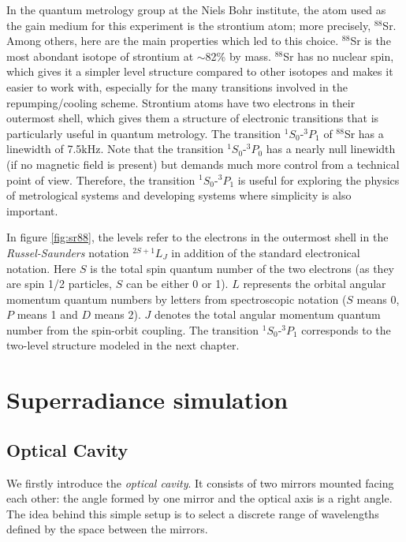 \documentclass[11pt]{report}
\begin{document}
In the quantum metrology group at the Niels Bohr institute, the atom used as the gain medium for this experiment is the strontium atom; more precisely, $^{88}$Sr. Among others, here are the main properties which led to this choice. $^{88}$Sr is the most abondant isotope of strontium at $\sim$82\% by mass. $^{88}$Sr has no nuclear spin, which gives it a simpler level structure compared to other isotopes and makes it easier to work with, especially for the many transitions involved in the repumping/cooling scheme. Strontium atoms have two electrons in their outermost shell, which gives them a structure of electronic transitions that is particularly useful in quantum metrology. The transition  $^1S_0$-$^3P_1$ of $^{88}$Sr has a linewidth of 7.5kHz. Note that the transition $^1S_0$-$^3P_0$ has a nearly null linewidth (if no magnetic field is present) but demands much more control from a technical point of view. Therefore, the transition $^1S_0$-$^3P_1$ is useful for exploring the physics of metrological systems and developing systems where simplicity is also important.

In figure \ref{fig:sr88}, the levels refer to the electrons in the outermost shell in the \textit{Russel-Saunders} notation $^{2S+1}L_J$ in addition of the standard electronical notation. Here $S$ is the total spin quantum number of the two electrons (as they are spin 1/2 particles, $S$ can be either 0 or 1). $L$ represents the orbital angular momentum quantum numbers by letters from spectroscopic notation ($S$ means 0, $P$ means 1 and $D$ means 2). $J$ denotes the total angular momentum quantum number from the spin-orbit coupling. The transition $^1S_0$-$^3P_1$ corresponds to the two-level structure modeled in the next chapter.



\chapter{Superradiance simulation}
\section{Optical Cavity}

We firstly introduce the \textit{optical cavity}. It consists of two mirrors mounted facing each other: the angle formed by one mirror and the optical axis is a right angle. The idea behind this simple setup is to select a discrete range of wavelengths defined by the space between the mirrors. 
\end{document}
